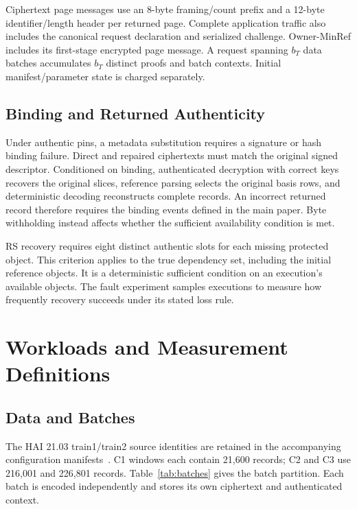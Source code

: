 \documentclass[10pt,journal,onecolumn]{IEEEtran}
\begin{document}
Ciphertext page messages use an 8-byte framing/count prefix and a 12-byte
identifier/length header per returned page. Complete application traffic
also includes the canonical request declaration and serialized challenge.
Owner-MinRef includes its first-stage encrypted page message. A request
spanning $b_T$ data batches accumulates $b_T$ distinct proofs and batch
contexts. Initial manifest/parameter state is charged separately.

\subsection{Binding and Returned Authenticity}
Under authentic pins, a metadata substitution requires a signature or hash
binding failure. Direct and repaired ciphertexts must match the original
signed descriptor. Conditioned on binding, authenticated decryption with
correct keys recovers the original slices, reference parsing selects the
original basis rows, and deterministic decoding reconstructs complete records.
An incorrect returned record therefore requires the binding events defined
in the main paper. Byte withholding instead affects whether the sufficient
availability condition is met.

RS recovery requires eight distinct authentic slots for each missing protected
object. This criterion applies to the true dependency set, including the
initial reference objects. It is a deterministic sufficient condition on an
execution's available objects. The fault experiment samples executions to
measure how frequently recovery succeeds under its stated loss rule.

\section{Workloads and Measurement Definitions}\label{sec:key-evidence}
\subsection{Data and Batches}
The HAI 21.03 train1/train2 source identities are retained in the accompanying
configuration manifests~\cite{Shin2021HAI}. C1 windows each contain 21,600
records; C2 and C3 use 216,001 and 226,801 records. Table~\ref{tab:batches}
gives the batch partition. Each batch is encoded independently and stores
its own ciphertext and authenticated context.
\end{document}
